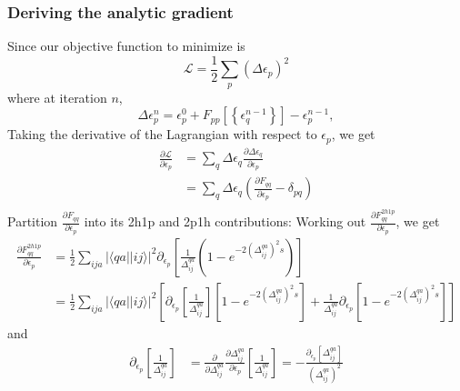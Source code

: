 \subsubsection{Deriving the analytic gradient}
Since our objective function to minimize is
\begin{equation}
    \mathcal{L} = \frac{1}{2} \sum_p \left( \Delta \epsilon_p \right)^2
\end{equation}
where at iteration $n$,
\begin{equation}
    \Delta \epsilon_p^n = \epsilon_p^0 + F_{pp}[\left\{\epsilon_q^{n-1}\right\}] - \epsilon_p^{n-1},
\end{equation}
Taking the derivative of the Lagrangian with respect to $\epsilon_p$, we get
\begin{align}
    \frac{\partial \mathcal{L}}{\partial \epsilon_p} &= \sum_q \Delta \epsilon_q \frac{\partial \Delta \epsilon_q}{\partial \epsilon_p}\\& = \sum_q \Delta \epsilon_q \left( \frac{\partial F_{qq}}{\partial \epsilon_p} - \delta_{pq} \right) \\
\end{align}
Partition $\frac{\partial F_{qq}}{\partial \epsilon_p}$ into its 2h1p and 2p1h contributions:
Working out $\frac{\partial F_{qq}^{2h1p}}{\partial \epsilon_p}$, we get
\begin{align}
    \frac{\partial F_{qq}^{2h1p}}{\partial \epsilon_p} & = \frac{1}{2} \sum_{i j a} |\langle q a||i j\rangle|^2 \partial_{\epsilon_p} \left[ \frac{1}{\Delta_{i j}^{q a}} \left(1-e^{-2\left(\Delta_{i j}^{q a}\right)^2 s}\right) \right] \\
& = \frac{1}{2} \sum_{i j a} |\langle q a||i j\rangle|^2 \left[ \partial_{\epsilon_p} \left[ \frac{1}{\Delta_{i j}^{q a}} \right] \left[1-e^{-2\left(\Delta_{i j}^{q a}\right)^2 s}\right]  + \frac{1}{\Delta_{i j}^{q a}} \partial_{\epsilon_p} \left[1-e^{-2\left(\Delta_{i j}^{q a}\right)^2 s}\right] \right] 
\end{align}
and
\begin{align}
\partial_{\epsilon_p} \left[ \frac{1}{\Delta_{i j}^{q a}} \right] & = \frac{\partial}{\partial \Delta_{i j}^{q a}} \frac{\partial \Delta_{i j}^{q a}}{\partial \epsilon_p} \left[ \frac{1}{\Delta_{i j}^{q a}} \right] = -\frac{\partial_{\epsilon_p} [\Delta_{i j}^{q a}]}{\left(\Delta_{i j}^{q a}\right)^2}
\end{align}
